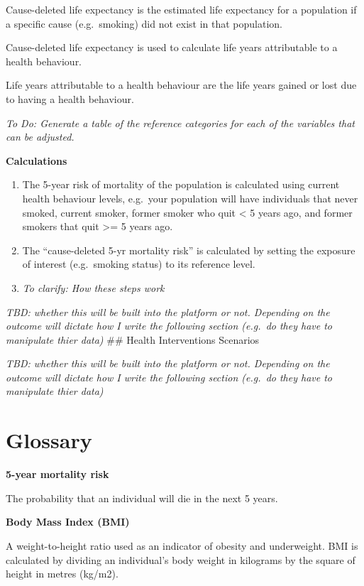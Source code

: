 \documentclass[]{book}
\begin{document}
Cause-deleted life expectancy is the estimated life expectancy for a
population if a specific cause (e.g.~smoking) did not exist in that
population.

Cause-deleted life expectancy is used to calculate life years
attributable to a health behaviour.

Life years attributable to a health behaviour are the life years gained
or lost due to having a health behaviour.

\emph{To Do: Generate a table of the reference categories for each of
the variables that can be adjusted.}

\textbf{Calculations}

\begin{enumerate}
\def\labelenumi{\arabic{enumi})}
\item
  The 5-year risk of mortality of the population is calculated using
  current health behaviour levels, e.g.~your population will have
  individuals that never smoked, current smoker, former smoker who quit
  \textless{} 5 years ago, and former smokers that quit \textgreater{}=
  5 years ago.
\item
  The ``cause-deleted 5-yr mortality risk'' is calculated by setting the
  exposure of interest (e.g.~smoking status) to its reference level.
\item
  \emph{To clarify: How these steps work}
\end{enumerate}

\emph{TBD: whether this will be built into the platform or not.
Depending on the outcome will dictate how I write the following section
(e.g.~do they have to manipulate thier data)} \#\# Health Interventions
Scenarios

\emph{TBD: whether this will be built into the platform or not.
Depending on the outcome will dictate how I write the following section
(e.g.~do they have to manipulate thier data)}

\chapter{Glossary}\label{glossary}

\textbf{5-year mortality risk}

The probability that an individual will die in the next 5 years.

\textbf{Body Mass Index (BMI)}

A weight-to-height ratio used as an indicator of obesity and
underweight. BMI is calculated by dividing an individual's body weight
in kilograms by the square of height in metres (kg/m2).
\end{document}
